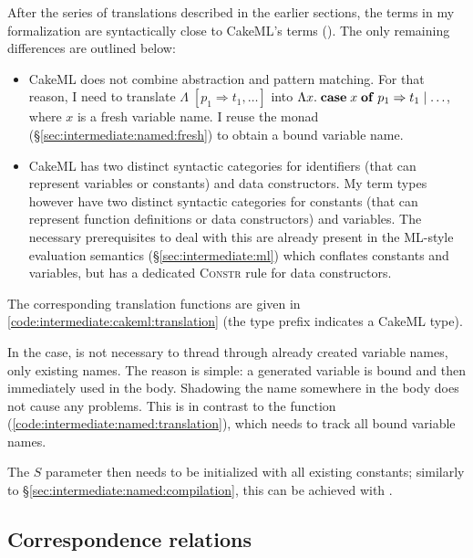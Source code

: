 After the series of translations described in the earlier sections, the terms in my formalization are syntactically close to CakeML's terms ().
The only remaining differences are outlined below:

\begin{itemize}
  \item
    CakeML does not combine abstraction and pattern matching.
    For that reason, I need to translate $\Lambda\;[p_1 \Rightarrow t_1, \ldots]$ into $\Lambda x.\;\mathtt{\mathbf{case}}\;x\;\mathtt{\mathbf{of}}\;p_1 \Rightarrow t_1 \mid \ldots$, where $x$ is a fresh variable name.
    I reuse the  monad (§\ref{sec:intermediate:named:fresh}) to obtain a bound variable name.
  \item
    CakeML has two distinct syntactic categories for identifiers (that can represent variables or constants) and data constructors.
    My term types however have two distinct syntactic categories for constants (that can represent function definitions or data constructors) and variables.
    The necessary prerequisites to deal with this are already present in the ML-style evaluation semantics (§\ref{sec:intermediate:ml}) which conflates constants and variables, but has a dedicated \textsc{Constr} rule for data constructors.
\end{itemize}

\noindent
The corresponding translation functions are given in \cref{code:intermediate:cakeml:translation} (the type prefix  indicates a CakeML type).

In the  case, is not necessary to thread through already created variable names, only existing names.
The reason is simple: a generated variable is bound and then immediately used in the body.
Shadowing the name somewhere in the body does not cause any problems.
This is in contrast to the  function (\cref{code:intermediate:named:translation}), which needs to track all bound variable names.

The $S$ parameter then needs to be initialized with all existing constants; similarly to §\ref{sec:intermediate:named:compilation}, this can be achieved with .

\subsection{Correspondence relations}

